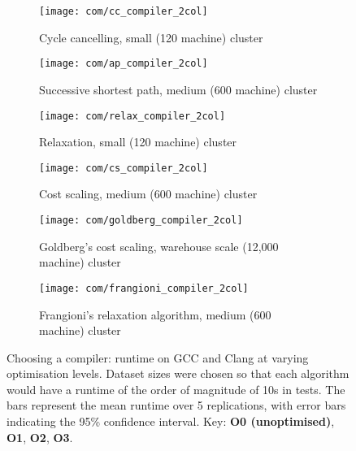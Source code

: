 \begin{figure}
    \begin{widepage}
    \begin{subfigure}[c]{0.5\textwidth}
        \texttt{[image: com/cc\_compiler\_2col]}
        \caption{Cycle cancelling, small (120 machine) cluster}
        \label{fig:compilers:cc}
    \end{subfigure}
    \begin{subfigure}[c]{0.5\textwidth}
        \texttt{[image: com/ap\_compiler\_2col]}
        \caption{Successive shortest path, medium (600 machine) cluster}
        \label{fig:compilers:ap}
    \end{subfigure}
    \begin{subfigure}[c]{0.5\textwidth}
        \texttt{[image: com/relax\_compiler\_2col]}
        \caption{Relaxation, small (120 machine) cluster}
        \label{fig:compilers:relax}
    \end{subfigure}
    \begin{subfigure}[c]{0.5\textwidth}
        \texttt{[image: com/cs\_compiler\_2col]}
        \caption{Cost scaling, medium (600 machine) cluster}
        \label{fig:compilers:cs}
    \end{subfigure}
    \begin{subfigure}[c]{0.5\textwidth}
        \texttt{[image: com/goldberg\_compiler\_2col]}
        \caption{Goldberg's cost scaling, warehouse scale (12,000 machine) cluster}
        \label{fig:compilers:goldberg}
    \end{subfigure}
    \begin{subfigure}[c]{0.5\textwidth}
        \texttt{[image: com/frangioni\_compiler\_2col]}
        \caption{Frangioni's relaxation algorithm, medium (600 machine) cluster}
        \label{fig:compilers:frangioni}
    \end{subfigure}
    \end{widepage}
    \caption[Choosing a compiler]{Choosing a compiler: runtime on GCC and Clang at varying optimisation levels. Dataset sizes were chosen so that each algorithm would have a runtime of the order of magnitude of 10s in tests. The bars represent the mean runtime over 5 replications, with error bars indicating the 95\% confidence interval. Key:  \textbf{\color{matplotlib_bar_r} O0 (unoptimised)}, \textbf{\color{matplotlib_bar_g} O1}, \textbf{\color{matplotlib_bar_b} O2}, \textbf{\color{matplotlib_bar_k} O3}.}
    \label{fig:compilers}
\end{figure}

